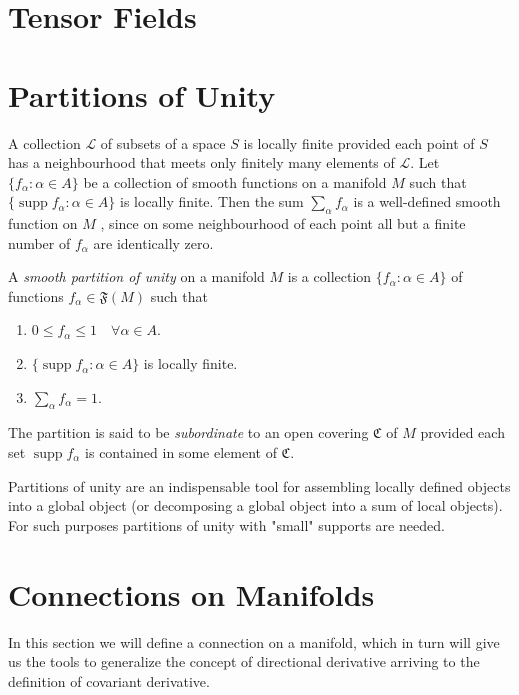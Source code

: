 \section{Tensor Fields}

\section{Partitions of Unity}
\label{sec:partitionunity}

A collection $\mathcal{L}$ of subsets of a space $S$ is locally finite provided each point of $S$ has a neighbourhood that meets only finitely many elements of $\mathcal{L}$. Let $\{f_\alpha \colon \alpha \in A\}$ be a collection of smooth functions on a manifold $M$ such that $\{\operatorname{supp} f_\alpha \colon \alpha \in A\}$ is locally finite. Then the sum $\sum_\alpha f_\alpha$ is a well-defined smooth function on $M$ , since on some neighbourhood of each point all but a finite number of $f_\alpha$ are identically zero.

\begin{definition}
	A \emph{smooth partition of unity} on a manifold $M$ is a collection $\{f_\alpha \colon \alpha \in A\}$ of functions $f_\alpha \in \mathfrak{F}(M)$ such that
	\begin{enumerate}
		\item $0 \leq f_\alpha \leq 1 \quad \forall \alpha \in A$.
		\item $\{\operatorname{supp} f_\alpha \colon \alpha \in A\}$ is locally finite.
		\item $\sum_\alpha f_\alpha = 1$.
	\end{enumerate}

	The partition is said to be \emph{subordinate} to an open covering $\mathfrak{C}$ of $M$ provided each set $\operatorname{supp} f_\alpha$ is contained in some element of $\mathfrak{C}$.
\end{definition}

Partitions of unity are an indispensable tool for assembling locally defined  objects into a global object (or decomposing a global object into a sum of local objects). For such purposes  partitions of unity with "small" supports are needed.


\section{Connections on Manifolds}

In this section we will define a connection on a manifold, which in turn will give us the tools to generalize the concept of directional derivative arriving to the definition of covariant derivative.

